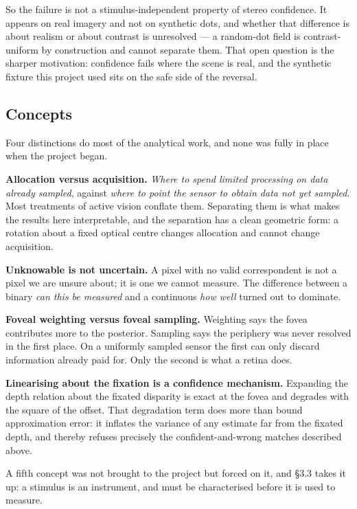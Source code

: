So the failure is not a stimulus-independent property of stereo confidence. It
appears on real imagery and not on synthetic dots, and whether that difference
is about realism or about contrast is unresolved --- a random-dot field is
contrast-uniform by construction and cannot separate them. That open question is
the sharper motivation: confidence fails where the scene is real, and the
synthetic fixture this project used sits on the safe side of the reversal.

\subsection{Concepts}

Four distinctions do most of the analytical work, and none was fully in place
when the project began.

\textbf{Allocation versus acquisition.} \emph{Where to spend limited processing
on data already sampled}, against \emph{where to point the sensor to obtain data
not yet sampled}. Most treatments of active vision conflate them. Separating
them is what makes the results here interpretable, and the separation has a
clean geometric form: a rotation about a fixed optical centre changes allocation
and cannot change acquisition.

\textbf{Unknowable is not uncertain.} A pixel with no valid correspondent is not
a pixel we are unsure about; it is one we cannot measure. The difference between
a binary \emph{can this be measured} and a continuous \emph{how well} turned out
to dominate.

\textbf{Foveal weighting versus foveal sampling.} Weighting says the fovea
contributes more to the posterior. Sampling says the periphery was never
resolved in the first place. On a uniformly sampled sensor the first can only
discard information already paid for. Only the second is what a retina does.

\textbf{Linearising about the fixation is a confidence mechanism.} Expanding the
depth relation about the fixated disparity is exact at the fovea and degrades
with the square of the offset. That degradation term does more than bound
approximation error: it inflates the variance of any estimate far from the
fixated depth, and thereby refuses precisely the confident-and-wrong matches
described above.

A fifth concept was not brought to the project but forced on it, and \S3.3 takes
it up: a stimulus is an instrument, and must be characterised before it is used
to measure.

